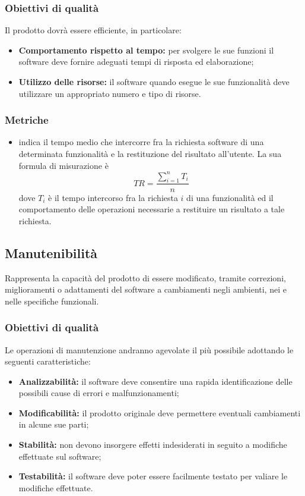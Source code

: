 \documentclass[PianoDiQualifica.tex]{subfiles}
\begin{document}
\subsubsection{Obiettivi di qualità}
Il prodotto dovrà essere efficiente, in particolare:
\begin{itemize}
	\item \textbf{Comportamento rispetto al tempo:} per svolgere le sue funzioni il software deve fornire adeguati tempi di risposta ed elaborazione;
	\item \textbf{Utilizzo delle risorse:} il software quando esegue le sue funzionalità deve utilizzare un appropriato numero e tipo di risorse.
\end{itemize}
\subsubsection{Metriche}
\begin{itemize}
	\item {} indica il tempo medio che intercorre fra la richiesta software di una determinata funzionalità e la restituzione del risultato all'utente. La sua formula di misurazione è \[TR=\frac{\sum_{i=1}^n T_i}{n}\] dove $ T_i $ è il tempo intercorso fra la richiesta $ i $ di una funzionalità ed il comportamento delle operazioni necessarie a restituire un risultato a tale richiesta.	
\end{itemize}
\subsection{Manutenibilità}
Rappresenta la capacità del prodotto di essere modificato, tramite correzioni, miglioramenti o adattamenti del software a cambiamenti negli ambienti, nei  e nelle specifiche funzionali.
\subsubsection{Obiettivi di qualità}
Le operazioni di manutenzione andranno agevolate il più possibile adottando le seguenti caratteristiche:
\begin{itemize}
	\item \textbf{Analizzabilità:} il software deve consentire una rapida identificazione delle possibili cause di errori e malfunzionamenti;
	\item \textbf{Modificabilità:} il prodotto originale deve permettere eventuali cambiamenti in alcune sue parti;
	\item \textbf{Stabilità:} non devono insorgere effetti indesiderati in seguito a modifiche effettuate sul software;
	\item \textbf{Testabilità:} il software deve poter essere facilmente testato per valiare le modifiche effettuate.
\end{itemize}
\end{document}
